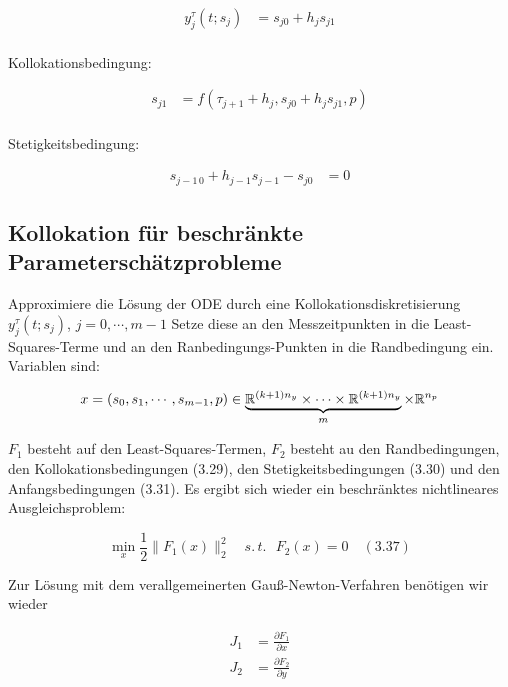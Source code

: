 \begin{align*}
y_j^\tau (t;s_j) &= s_{j0} + h_j s_{j1} \\
\end{align*}


Kollokationsbedingung:

\begin{align*}
s_{j1} &= f(\tau_{j+1} + h_j, s_{j0} + h_j s_{j1}, p) \\
\end{align*}

Stetigkeitsbedingung:

\begin{align*}
s_{j-1\,0} + h_{j-1}s_{j-1} - s_{j0} &= 0 
\end{align*}

\subsection*{Kollokation für beschränkte Parameterschätzprobleme}

Approximiere die Lösung der ODE durch eine Kollokationsdiskretisierung $y_j^\tau (t; s_j)$, $j=0,\cdots,m-1$ Setze diese an den Messzeitpunkten in die Least-Squares-Terme und an den Ranbedingungs-Punkten in die Randbedingung ein. Variablen sind:

\begin{align*}
x &= (s_0,s_1,\cdots,s_{m-1},p) \in \underbrace{ \mathbb{R}^{(k+1)n_y} \times \cdots \times \mathbb{R}^{(k+1)n_y}}_{m} \times \mathbb{R}^{n_p} \\
\end{align*}

$F_1$ besteht auf den Least-Squares-Termen, $F_2$ besteht au den Randbedingungen, den Kollokationsbedingungen (3.29), den Stetigkeitsbedingungen (3.30) und den Anfangsbedingungen (3.31). Es ergibt sich wieder ein beschränktes nichtlineares Ausgleichsproblem:

\[ \min_x \frac 12 \| F_1(x) \|_2^2 \quad s.\,t. \text{ } F_2(x) = 0 \quad (3.37) \]

Zur Lösung mit dem verallgemeinerten Gauß-Newton-Verfahren benötigen wir wieder

\begin{align*}
J_1 &= \frac{\partial F_1}{\partial x} \\
J_2 &= \frac{\partial F_2}{\partial y}
\end{align*}


